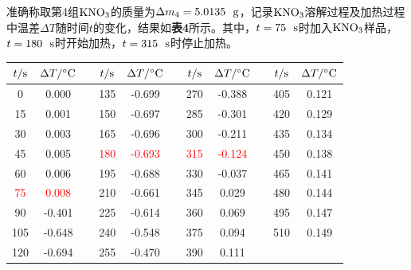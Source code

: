 \documentclass[12pt]{article}
\begin{document}
准确称取第4组$\rm KNO_{3}$的质量为$\Delta m_{4}=5.0135\ \ {\rm g}$，记录$\rm KNO_{3}$溶解过程及加热过程中温差$\Delta T$随时间$t$的变化，结果如\textbf{表4}所示。其中，$t=75\ \ {\rm s}$时加入$\rm KNO_{3}$样品，$t=180\ \ {\rm s}$时开始加热，$t=315\ \ {\rm s}$时停止加热。
\begin{table}[h]
	\centering
	\begin{tabular}{ccccccccccc}
		\toprule
		$t/{\rm s}$ & $\Delta T/{\rm ^{\circ}C}$ & & $t/{\rm s}$ & $\Delta T/{\rm ^{\circ}C}$& & 	$t/{\rm s}$ & $\Delta T/{\rm ^{\circ}C}$ & & $t/{\rm s}$ & $\Delta T/{\rm ^{\circ}C}$ \\
		\midrule
		0   & 0.000      &  & 135 & -0.699 &  & 270 & -0.388 &  & 405 & 0.121 \\
		15  & 0.001  &  & 150 & -0.697 &  & 285 & -0.301 &  & 420 & 0.129 \\
		30  & 0.003  &  & 165 & -0.696 &  & 300 & -0.211 &  & 435 & 0.134 \\
		45  & 0.005  &  & \textcolor{red}{180} & \textcolor{red}{-0.693} &  & \textcolor{red}{315} & \textcolor{red}{-0.124} &  & 450 & 0.138 \\
		60  & 0.006  &  & 195 & -0.688 &  & 330 & -0.037 &  & 465 & 0.141 \\
		\textcolor{red}{75}  & \textcolor{red}{0.008}  &  & 210 & -0.661 &  & 345 & 0.029  &  & 480 & 0.144 \\
		90  & -0.401 &  & 225 & -0.614 &  & 360 & 0.069  &  & 495 & 0.147 \\
		105 & -0.648 &  & 240 & -0.548 &  & 375 & 0.094  &  & 510 & 0.149 \\
		120 & -0.694 &  & 255 & -0.470  &  & 390 & 0.111  &  &     &     \\
		\bottomrule
	\end{tabular}
\end{table}
\par
\end{document}
